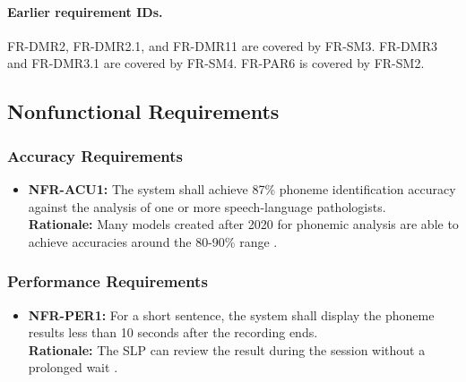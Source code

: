 \documentclass[12pt]{article}
\begin{document}
\paragraph{Earlier requirement IDs.}
FR-DMR2, FR-DMR2.1, and FR-DMR11 are covered by FR-SM3.
FR-DMR3 and FR-DMR3.1 are covered by FR-SM4.
FR-PAR6 is covered by FR-SM2.

\subsection{Nonfunctional Requirements} \label{sec:nonfunctional-requirements}
    \subsubsection{Accuracy Requirements}
    \begin{itemize}
        \item \textbf{NFR-ACU1:} The system shall achieve 87\% phoneme identification accuracy against the analysis of one or more speech-language pathologists.\\
        \textbf{Rationale: } Many models created after 2020 for phonemic analysis are able to achieve accuracies around the 80-90\% range \cite{auto_english_pron}.    
    \end{itemize}

    \subsubsection{Performance Requirements}
    \begin{itemize}
        \item \textbf{NFR-PER1:} For a short sentence, the system shall display the phoneme results less than 10 seconds after the recording ends. \\
        \textbf{Rationale:} The SLP can review the result during the session without a prolonged wait \cite{software_response_times}.
    \end{itemize}
\end{document}

